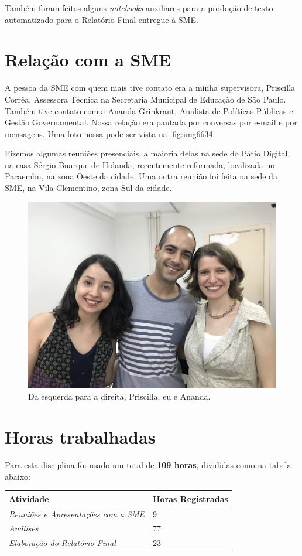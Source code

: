 \documentclass[12pt, a4paper]{article}
\begin{document}
Também foram feitos alguns \textit{notebooks} auxiliares para a produção de texto automatizado para o Relatório Final entregue à SME.

\section{Relação com a SME}

A pessoa da SME com quem mais tive contato era a minha supervisora, Priscilla Corrêa, Assessora Técnica na Secretaria Municipal de Educação de São Paulo. Também tive contato com a Ananda Grinkraut, Analista de Políticas Públicas e Gestão Governamental. Nossa relação era pautada por conversas por e-mail e por mensagens. Uma foto nossa pode ser vista na \autoref{fig:img6634}

Fizemos algumas reuniões presenciais, a maioria delas na sede do Pátio Digital, na casa Sérgio Buarque de Holanda, recentemente reformada, localizada no Pacaembu, na zona Oeste da cidade. Uma outra reunião foi feita na sede da SME, na Vila Clementino, zona Sul da cidade.

\begin{figure}[H]
	\centering
	\includegraphics[width=0.7\linewidth]{IMG_6634}
	\caption{Da esquerda para a direita, Priscilla, eu e Ananda.}
	\label{fig:img6634}
\end{figure}


\section{Horas trabalhadas}

Para esta disciplina foi usado um total de \textbf{109 horas}, divididas como na tabela abaixo:

\begin{table}[H]
	\centering
	\begin{tabular}{l|l}
		\textbf{Atividade}                                   & \textbf{Horas Registradas} \\ \hline
		\textit{Reuniões e Apresentações com a SME} & 9                          \\ \hline
		\textit{Análises}                           & 77                         \\ \hline
		\textit{Elaboração do Relatório Final}    & 23                         \\ 
	\end{tabular}
\end{table}
\end{document}

